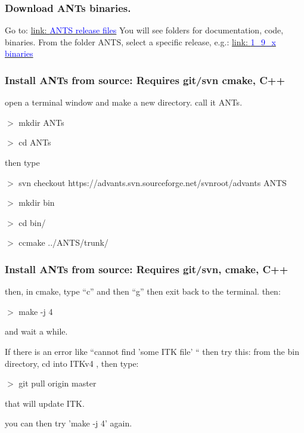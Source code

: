\documentclass[18pt]{beamer}
\begin{document}
\begin{frame}
\frametitle{Download ANTs binaries.}
Go to:
\newline
\newline
\href{http://sourceforge.net/projects/advants/files/}{link: \textcolor{blue}{ANTS release files}}
\newline
\newline
 You will see folders for documentation, code, binaries.
\newline
\newline
From the folder ANTS, select a specific release, e.g.:
\newline
\newline
\href{http://sourceforge.net/projects/advants/files/ANTS/ANTS_1_9\_x/}{link: \textcolor{blue}{1\_9\_x binaries}}
\end{frame}

\begin{frame}
\frametitle{Install ANTs from source: Requires  git/svn cmake, C++}
open a terminal window and make a new directory.  call it ANTs.

$>$ mkdir ANTs

$>$ cd ANTs

then type

$>$ svn checkout https://advants.svn.sourceforge.net/svnroot/advants
ANTS

$>$  mkdir bin

$>$  cd bin/

$>$  ccmake ../ANTS/trunk/

\end{frame}

\begin{frame}
\frametitle{Install ANTs from source: Requires  git/svn, cmake, C++}

then, in cmake, type “c” and then “g”  then exit back to the
terminal.   then:

$>$  make -j 4

and wait a while.

If there is an error like  ``cannot find 'some ITK file' `` then try
this:
\newline
\newline
from the bin directory, cd into ITKv4 , then type:

$>$  git pull origin master

that will update ITK.

you can then try 'make -j 4' again.
\end{frame}
\end{document}
